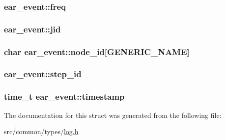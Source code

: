 \subsubsection[{\texorpdfstring{freq}{freq}}]{ ear\+\_\+event\+::freq}\hypertarget{structear__event_aedf43a51d14908b79e030af38a20a70c}{}\label{structear__event_aedf43a51d14908b79e030af38a20a70c}
\subsubsection[{\texorpdfstring{jid}{jid}}]{ ear\+\_\+event\+::jid}\hypertarget{structear__event_a309c896c171c9ce468dc576d65c051a4}{}\label{structear__event_a309c896c171c9ce468dc576d65c051a4}
\subsubsection[{\texorpdfstring{node\+\_\+id}{node_id}}]{\setlength{\rightskip}{0pt plus 5cm}char ear\+\_\+event\+::node\+\_\+id\mbox{[}{\bf G\+E\+N\+E\+R\+I\+C\+\_\+\+N\+A\+ME}\mbox{]}}\hypertarget{structear__event_a9b7eae0e514fd7c3135409479bd4e6d0}{}\label{structear__event_a9b7eae0e514fd7c3135409479bd4e6d0}
\subsubsection[{\texorpdfstring{step\+\_\+id}{step_id}}]{ ear\+\_\+event\+::step\+\_\+id}\hypertarget{structear__event_ab5788e6f70b95d710f14392ef6f5ae74}{}\label{structear__event_ab5788e6f70b95d710f14392ef6f5ae74}
\subsubsection[{\texorpdfstring{timestamp}{timestamp}}]{\setlength{\rightskip}{0pt plus 5cm}time\+\_\+t ear\+\_\+event\+::timestamp}\hypertarget{structear__event_a2d3079e677c19bbe769dcb0472627d4f}{}\label{structear__event_a2d3079e677c19bbe769dcb0472627d4f}


The documentation for this struct was generated from the following file\+:\begin{DoxyCompactItemize}
\item 
src/common/types/\hyperlink{log_8h}{log.\+h}\end{DoxyCompactItemize}
